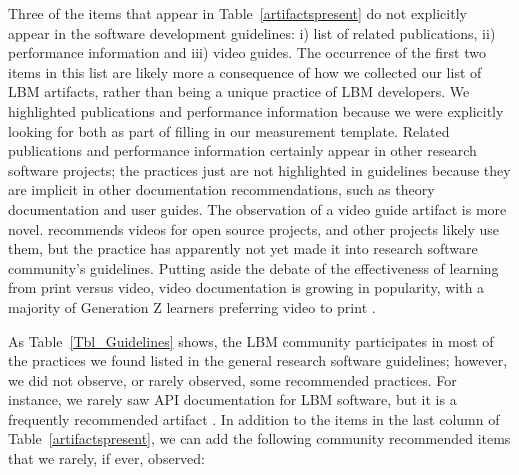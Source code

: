 \documentclass[final, 3p, times, authoryear]{elsarticle}
\begin{document}
Three of the items that appear in Table~\ref{artifactspresent} do not explicitly
appear in the software development guidelines: i) list of related publications,
ii) performance information and iii) video guides.  The occurrence of the first
two items in this list are likely more a consequence of how we collected our
list of LBM artifacts, rather than being a unique practice of LBM developers. We
highlighted publications and performance information because we were explicitly
looking for both as part of filling in our measurement template. Related
publications and performance information certainly appear in other research
software projects; the practices just are not highlighted in guidelines because
they are implicit in other documentation recommendations, such as theory
documentation and user guides. The observation of a video guide artifact is more
novel.  \citet{Fogel2005} recommends videos for open source projects, and other
projects likely use them, but the practice has apparently not yet made it into
research software community's guidelines.  Putting aside the debate of the
effectiveness of learning from print versus video, video documentation is
growing in popularity, with a majority of Generation Z learners preferring video
to print \citep{Genota2018}.

As Table~\ref{Tbl_Guidelines} shows, the LBM community participates in most of
the practices we found listed in the general research software guidelines;
however, we did not observe, or rarely observed, some recommended practices. For
instance, we rarely saw API documentation for LBM software, but it is a
frequently recommended artifact \citep{SmithAndRoscoe2018, ThielEtAl2020,
vanGompelEtAl2016, OrvizEtAl2017, SSI2022, Zadka2018}.  In addition to the items
in the last column of Table~\ref{artifactspresent}, we can add the following
community recommended items that we rarely, if ever, observed:
\end{document}
